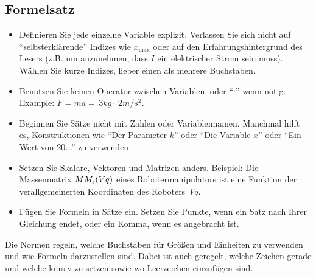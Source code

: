 \subsection{Formelsatz }
\label{sec:formulas}



\begin{itemize}
\item Definieren Sie jede einzelne Variable explizit. Verlassen Sie sich nicht auf ``selbsterklärende'' Indizes wie $x_{\mathrm{max}}$ oder auf den Erfahrungshintergrund des Lesers (z.B. um anzunehmen, dass $I$ ein elektrischer Strom sein muss). Wählen Sie kurze Indizes, lieber einen als mehrere Buchstaben. 
	\item Benutzen Sie keinen Operator zwischen Variablen, oder ``$\cdot$'' wenn nötig. Example: $F=ma=\,{3}{kg}\cdot\,{2}{m/s^2}$.

\item Beginnen Sie Sätze nicht mit Zahlen oder Variablennamen. Manchmal hilft es, Konstruktionen wie ``Der Parameter $k$'' oder ``Die Variable $x$'' oder ``Ein Wert von 20...'' zu verwenden.

\item Setzen Sie Skalare, Vektoren und Matrizen anders. Beispiel:
Die Massenmatrix $M M_{\textnormal{r}}(V{q})$ eines Robotermanipulators ist eine Funktion der verallgemeinerten Koordinaten des Roboters~$V{q}$.
\item Fügen Sie Formeln in Sätze ein. Setzen Sie Punkte, wenn ein Satz nach Ihrer Gleichung endet, oder ein Komma, wenn es angebracht ist. 

\end{itemize}

Die Normen \cite{ISOnormunits}\cite{DINGroessen}\cite{DINFormelsatz}\cite{DINGroessen} 
regeln, welche Buchstaben für Größen und Einheiten zu verwenden und wie Formeln darzustellen sind. Dabei ist auch geregelt, welche Zeichen gerade und welche kursiv zu setzen sowie wo Leerzeichen einzufügen
sind.

